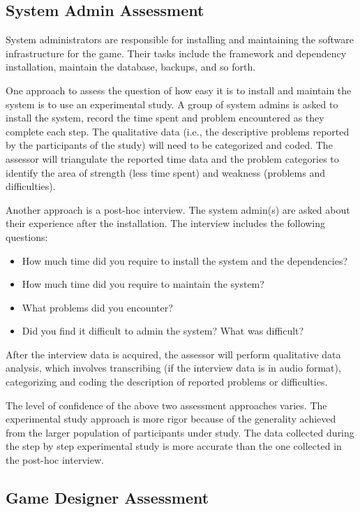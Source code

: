 \subsection{System Admin Assessment}

System administrators are responsible for installing and maintaining the software infrastructure
for the game. Their tasks include the framework and dependency installation, maintain the database, backups, and so forth.

One approach to assess the question of how easy it is to install and maintain the system is to use
an experimental study. A group of system admins is asked to install the system, record the time
spent and problem encountered as they complete each step. The qualitative data (i.e., the
descriptive problems reported by the participants of the study) will need to be categorized and
coded. The assessor will triangulate the reported time data and the problem categories to identify
the area of strength (less time spent) and weakness (problems and difficulties).

Another approach is a post-hoc interview. The system admin(s) are asked about their experience
after the installation. The interview includes the following questions:

\begin{itemize}
\item How much time did you require to install the system and the dependencies?
\item How much time did you require to maintain the system?
\item What problems did you encounter?
\item Did you find it difficult to admin the system? What was difficult?
\end{itemize}

After the interview data is acquired, the assessor will perform qualitative data
analysis, which involves transcribing (if the interview data is in audio format),
categorizing and coding the description of reported problems or difficulties.

The level of confidence of the above two assessment approaches varies. The experimental study
approach is more rigor because of the generality achieved from the larger population of
participants under study. The data collected during the step by step experimental study is more
accurate than the one collected in the post-hoc interview.

\subsection{Game Designer Assessment}

